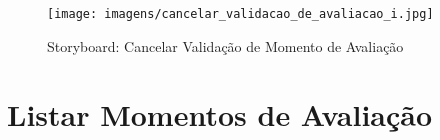 \begin{figure}[!htbp]
\centering
\texttt{[image: imagens/cancelar\_validacao\_de\_avaliacao\_i.jpg]}
\caption{Storyboard: Cancelar Validação de Momento de Avaliação}
\label{fig:cancelar_validacao_de_avaliacao_i}
\end{figure}

\clearpage
\section{Listar Momentos de Avaliação}